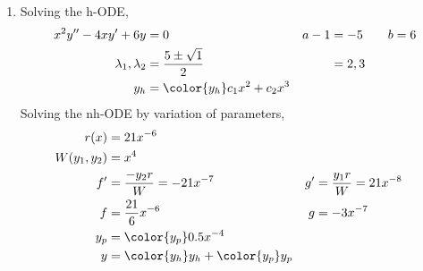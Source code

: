 \begin{enumerate}
    \item Solving the h-ODE,
          \begin{align}
              x^{2}y'' - 4xy' + 6y     & = 0                                     &
              a - 1                    & = -5 \qquad b = 6                         \\
              \lambda_{1}, \lambda_{2} & = \frac{5 \pm \sqrt{1}}{2}              &
                                       & = 2, 3                                    \\
              y_{h}                    & = {\color{y_h} c_{1}x^{2} + c_{2}x^{3}}
          \end{align}
          Solving the nh-ODE by variation of parameters,
          \begin{align}
              r(x)            & = 21x^{-6}                                    \\
              W(y_{1}, y_{2}) & = x^{4}                                       \\
              f'              & = \frac{-y_{2}r}{W} = -21x^{-7}             &
              g'              & = \frac{y_{1}r}{W} = 21x^{-8}                 \\
              f               & = \frac{21}{6}x^{-6}                        &
              g               & = -3x^{-7}                                    \\
              y_{p}           & = {\color{y_p} 0.5x^{-4}}                     \\
              y               & = {\color{y_h} y_{h}} + {\color{y_p} y_{p}}
          \end{align}


\end{enumerate}
